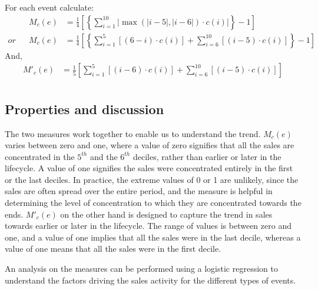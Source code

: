 \documentclass[letterpaper, 12pt]{article}
\begin{document}
\noindent For each event calculate:
\begin{align*}
	&&M_c(e) &= \frac{1}{4}\left[\left\{\sum_{i=1}^{10} \left| \max(|i-5|,|i-6|) \cdot c(i) \right|\right\} -1 \right]\\
	or&&M_c(e) &= \frac{1}{4}\left[\left\{\sum_{i=1}^{5} \left[ (6-i) \cdot c(i) \right] +\sum_{i=6}^{10} \left[ (i-5) \cdot c(i) \right]\right\} -1 \right]
\end{align*}
And, 
\begin{align*}
	M'_c(e) &= \frac{1}{5}\left[\sum_{i=1}^{5} \left[ (i-6) \cdot c(i) \right] +\sum_{i=6}^{10} \left[ (i-5) \cdot c(i) \right]\right]\\
\end{align*}

\subsection{Properties and discussion}
The two measures work together to enable us to understand the trend. $M_c(e)$ varies between zero and one, where a value of zero signifies that all the sales are concentrated in the $5^{th}$ and the $6^{th}$ deciles, rather than earlier or later in the lifecycle. A value of one signifies the sales were concentrated entirely in the first or the last deciles. In practice, the extreme values of 0 or 1 are unlikely, since the sales are often spread over the entire period, and the measure is helpful in determining the level of concentration to which they are concentrated towards the ends. $M'_c(e)$ on the other hand is designed to capture the trend in sales towards earlier or later in the lifecycle. The range of values is between zero and one, and a value of one implies that all the sales were in the last decile, whereas a value of one means that all the sales were in the first decile. 

An analysis on the measures can be performed using a logistic regression to understand the factors driving the sales activity for the different types of events.
\end{document}
